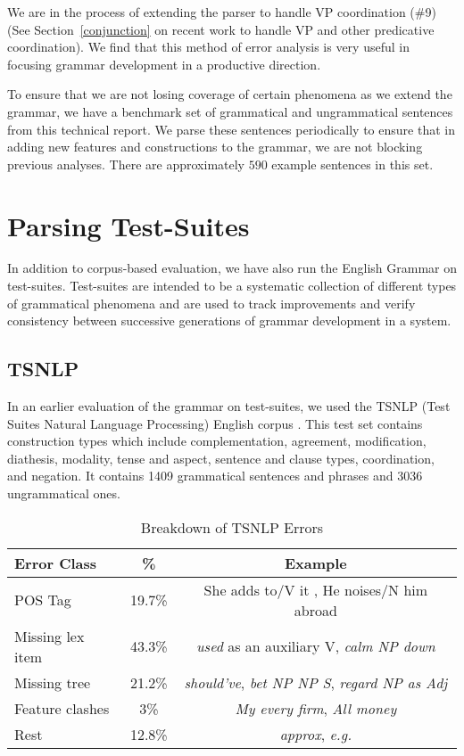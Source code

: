 We are in the process of extending the parser to handle VP coordination
(\#9) (See Section~\ref{conjunction} on recent work to handle VP and other
predicative coordination). We find that this method of error analysis is
very useful in focusing grammar development in a productive direction.

To ensure that we are not losing coverage of certain phenomena as we
extend the grammar, we have a benchmark set of grammatical and
ungrammatical sentences from this technical report. We parse these
sentences periodically to ensure that in adding new features and
constructions to the grammar, we are not blocking previous analyses.
There are approximately $590$ example sentences in this set.

\section{Parsing Test-Suites}

In addition to corpus-based evaluation, we have also run the English
Grammar on test-suites. Test-suites are intended to be a systematic
collection of different types of grammatical phenomena and are used to
track improvements and verify consistency between successive generations of
grammar development in a system.

\subsection{TSNLP}

In an earlier evaluation of the grammar on test-suites, we used the TSNLP
(Test Suites Natural Language Processing) English corpus
\cite{Lehmann96}. This test set contains construction types which include
complementation, agreement, modification, diathesis, modality, tense and
aspect, sentence and clause types, coordination, and negation. It contains
1409 grammatical sentences and phrases and 3036 ungrammatical ones.

\begin{table*}[htb]
\centering
\begin{tabular}{|l|c|c|}
\hline
Error Class & \% & Example \\ \hline
POS Tag &  19.7\% & She adds  to/V it , He noises/N him abroad \\ \hline
Missing lex item & 43.3\% & {\it used} as an auxiliary V, {\it calm NP down} \\ \hline
Missing tree & 21.2\% & {\it should've}, {\it bet NP NP S}, {\it
regard NP as Adj} \\ \hline
Feature clashes & 3\% & {\it My every firm}, {\it All money} \\ \hline
Rest&12.8\% & {\it approx}, {\it e.g.} \\
\hline
\end{tabular}
\caption{Breakdown of TSNLP Errors}
\label{tsnlp-table}
\end{table*} 

